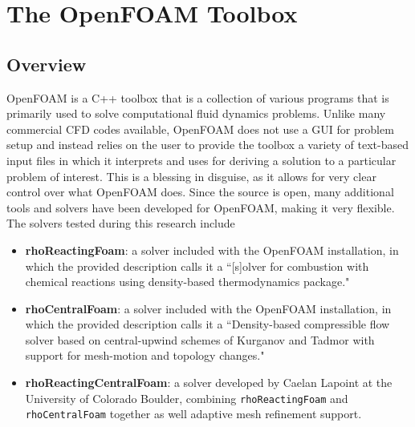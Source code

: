 \chapter{The OpenFOAM Toolbox}
\label{chap:of}

\section{Overview}
OpenFOAM is a C++ toolbox that is a collection of various programs that is primarily used to solve computational fluid dynamics problems. Unlike many commercial CFD codes available, OpenFOAM does not use a GUI for problem setup and instead relies on the user to provide the toolbox a variety of text-based input files in which it interprets and uses for deriving a solution to a particular problem of interest. This is a blessing in disguise, as it allows for very clear control over what OpenFOAM does. Since the source is open, many additional tools and solvers have been developed for OpenFOAM, making it very flexible. The solvers tested during this research include 
\begin{itemize}
    \item \textbf{rhoReactingFoam}: a solver included with the OpenFOAM installation, in which the provided description calls it a ``[s]olver for combustion with chemical reactions using density-based thermodynamics package."
    \item \textbf{rhoCentralFoam}: a solver included with the OpenFOAM installation, in which the provided description calls it a ``Density-based compressible flow solver based on central-upwind schemes of Kurganov and Tadmor with support for mesh-motion and topology changes."
    \item \textbf{rhoReactingCentralFoam}: a solver developed by Caelan Lapoint at the University of Colorado Boulder, combining \verb|rhoReactingFoam| and \verb|rhoCentralFoam| together as well adaptive mesh refinement support. 
\end{itemize}


